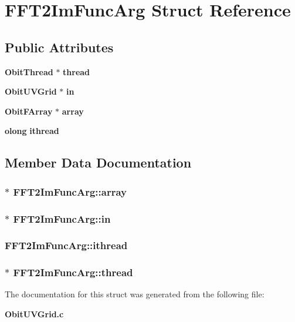 \section{FFT2Im\-Func\-Arg Struct Reference}
\label{structFFT2ImFuncArg}
\subsection*{Public Attributes}
\begin{CompactItemize}
\item 
{\bf Obit\-Thread} $\ast$ {\bf thread}
\item 
{\bf Obit\-UVGrid} $\ast$ {\bf in}
\item 
{\bf Obit\-FArray} $\ast$ {\bf array}
\item 
{\bf olong} {\bf ithread}
\end{CompactItemize}


\subsection{Member Data Documentation}
\subsubsection{$\ast$ {\bf FFT2Im\-Func\-Arg::array}}\label{structFFT2ImFuncArg_o2}


\subsubsection{$\ast$ {\bf FFT2Im\-Func\-Arg::in}}\label{structFFT2ImFuncArg_o1}


\subsubsection{ {\bf FFT2Im\-Func\-Arg::ithread}}\label{structFFT2ImFuncArg_o3}


\subsubsection{$\ast$ {\bf FFT2Im\-Func\-Arg::thread}}\label{structFFT2ImFuncArg_o0}




The documentation for this struct was generated from the following file:\begin{CompactItemize}
\item 
{\bf Obit\-UVGrid.c}\end{CompactItemize}
